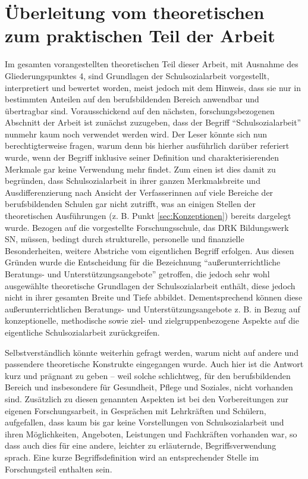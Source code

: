 \section{Überleitung vom theoretischen zum praktischen Teil der Arbeit}
\label{sec:ÜberleitungVomTheoretischenZumPraktischenTeilDerArbeit}

Im gesamten vorangestellten theoretischen Teil dieser Arbeit, mit Ausnahme des Gliederungspunktes 4, sind Grundlagen der Schulsozialarbeit vorgestellt, interpretiert und bewertet worden, meist jedoch mit dem Hinweis, dass sie nur in bestimmten Anteilen auf den berufsbildenden Bereich anwendbar und übertragbar sind. Vorausschickend auf den nächsten, forschungsbezogenen Abschnitt der Arbeit ist zunächst zuzugeben, dass der Begriff "`Schulsozialarbeit"' nunmehr kaum noch verwendet werden wird. Der Leser könnte sich nun berechtigterweise fragen, warum denn bis hierher ausführlich darüber referiert wurde, wenn der Begriff inklusive seiner Definition und charakterisierenden Merkmale gar keine Verwendung mehr findet. Zum einen ist dies damit zu begründen, dass Schulsozialarbeit in ihrer ganzen Merkmalsbreite und Ausdifferenzierung nach Ansicht der Verfasserinnen auf viele Bereiche der berufsbildenden Schulen gar nicht zutrifft, was an einigen Stellen der theoretischen Ausführungen (z. B. Punkt \ref{sec:Konzeptionen}) bereits dargelegt wurde. Bezogen auf die vorgestellte Forschungsschule, das DRK Bildungswerk SN, müssen, bedingt durch strukturelle, personelle und finanzielle Besonderheiten, weitere Abstriche vom eigentlichen Begriff erfolgen. Aus diesen Gründen wurde die Entscheidung für die Bezeichnung "`außerunterrichtliche Beratungs- und Unterstützungsangebote"' getroffen, die jedoch sehr wohl ausgewählte theoretische Grundlagen der Schulsozialarbeit enthält, diese jedoch nicht in ihrer gesamten Breite und Tiefe abbildet. Dementsprechend können diese außerunterrichtlichen Beratungs- und Unterstützungsangebote z. B. in Bezug auf konzeptionelle, methodische sowie ziel- und zielgruppenbezogene Aspekte auf die eigentliche Schulsozialarbeit zurückgreifen. 

Selbstverständlich könnte weiterhin gefragt werden, warum nicht auf andere und passendere theoretische Konstrukte eingegangen wurde. Auch hier ist die Antwort kurz und prägnant zu geben -- weil solche schlichtweg, für den berufsbildenden Bereich und insbesondere für Gesundheit, Pflege und Soziales, nicht vorhanden sind. Zusätzlich zu diesen genannten Aspekten ist bei den Vorbereitungen zur eigenen Forschungsarbeit, in Gesprächen mit Lehrkräften und Schülern, aufgefallen, dass kaum bis gar keine Vorstellungen von Schulsozialarbeit und ihren Möglichkeiten, Angeboten, Leistungen und Fachkräften vorhanden war, so dass auch dies für eine andere, leichter zu erläuternde, Begriffsverwendung sprach. Eine kurze Begriffsdefinition wird an entsprechender Stelle im Forschungsteil enthalten sein. 

